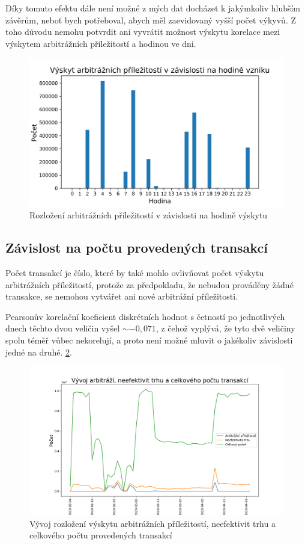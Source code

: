 \documentclass[thesis=B,czech]{FITthesis}[2019/03/21]
\begin{document}
Díky tomuto efektu dále není možné z mých dat docházet k jakýmkoliv hlubším závěrům, neboť bych potřeboval, abych měl zaevidovaný vyšší počet výkyvů. Z toho důvodu nemohu potvrdit ani vyvrátit možnost výskytu korelace mezi výskytem arbitrážních příležitostí a hodinou ve dni.

\begin{figure}\centering
	\includegraphics[width=1\textwidth]{images/hours_distribution.png}
	\caption{Rozložení arbitrážních příležitostí v závislosti na hodině výskytu }\label{hours_distribution}
\end{figure}
\subsection{Závislost na počtu provedených transakcí}
Počet transakcí je číslo, které by také mohlo ovlivňovat počet výskytu arbitrážních příležitostí, protože za předpokladu, že nebudou prováděny žádné transakce, se nemohou vytvářet ani nové arbitrážní příležitosti.

Pearsonův korelační koeficient diskrétních hodnot s četností po jednotlivých dnech těchto dvou veličin vyšel \(\sim-0,071\), z čehož vyplývá, že tyto dvě veličiny spolu téměř vůbec nekorelují, a proto není možné mluvit o jakékoliv závislosti jedné na druhé. \ref{occurence_correlation}.

\begin{figure}\centering
	\includegraphics[width=1\textwidth]{images/occurence_correlation.png}
	\caption{Vývoj rozložení výskytu arbitrážních příležitostí, neefektivit trhu a celkového počtu provedených transakcí}\label{occurence_correlation}
\end{figure}
\end{document}
